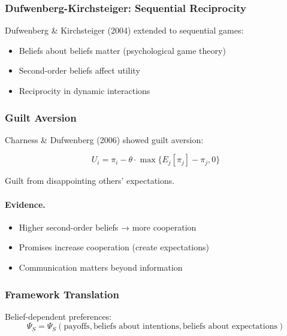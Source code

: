 \subsubsection{Dufwenberg-Kirchsteiger: Sequential Reciprocity}

Dufwenberg \& Kirchsteiger (2004) extended to sequential games:
\begin{itemize}
    \item Beliefs about beliefs matter (psychological game theory)
    \item Second-order beliefs affect utility
    \item Reciprocity in dynamic interactions
\end{itemize}

\subsubsection{Guilt Aversion}

Charness \& Dufwenberg (2006) showed guilt aversion:

\begin{equation}
\boxed{
U_i = \pi_i - \theta \cdot \max\{E_j[\pi_j] - \pi_j, 0\}
}
\label{eq:guilt}
\end{equation}

Guilt from disappointing others' expectations.

\paragraph{Evidence.}
\begin{itemize}
    \item Higher second-order beliefs → more cooperation
    \item Promises increase cooperation (create expectations)
    \item Communication matters beyond information
\end{itemize}

\subsubsection{Framework Translation}

Belief-dependent preferences:
\begin{equation}
\Psi_S = \Psi_S(\text{payoffs}, \text{beliefs about intentions}, \text{beliefs about expectations})
\end{equation}

